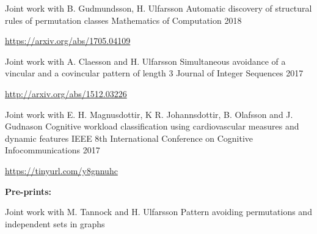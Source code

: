 


\begin{cventries}
  \cventry
    {Joint work with B. Gudmundsson, H. Ulfarsson} %
    {Automatic discovery of structural rules of permutation classes} %
    {Mathematics of Computation} %
    {2018} %
    {
      \begin{cvitems} %
        \item \url{https://arxiv.org/abs/1705.04109}
      \end{cvitems}
    }%
  \cventry
    {Joint work with A. Claesson and H. Ulfarsson} %
    {Simultaneous avoidance of a vincular and a covincular pattern of length 3} %
    {Journal of Integer Sequences} %
    {2017} %
    {
      \begin{cvitems} %
        \item \url{http://arxiv.org/abs/1512.03226}
      \end{cvitems}
    }%
  \cventry
    {Joint work with E. H. Magnusdottir, K R. Johannsdottir, B. Olafsson and J. Gudnason} %
    {Cognitive workload classification using cardiovascular measures and dynamic features\vspace{-1em}} %
    {\vspace{-0.5em}IEEE 8th International Conference on Cognitive Infocommunications} %
    {2017} %
    {
    \begin{cvitems} %
      \item \url{https://tinyurl.com/y8gnnuhc}
    \end{cvitems}
    }%
\begin{flushleft}
  \textbf{Pre-prints:}
\end{flushleft}
  \cventry
    {Joint work with M. Tannock and H. Ulfarsson} %
    {Pattern avoiding permutations and independent sets in graphs} %

\end{cventries}
